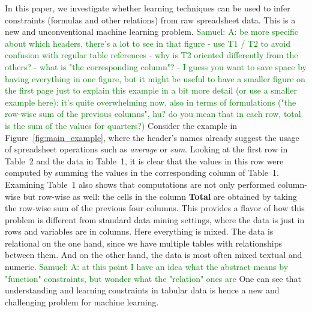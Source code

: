 \documentclass{IEEEtran}
\newcommand{\samuel}[1]{\textcolor{green}{{\sc Samuel:} #1}\xspace}
\theoremstyle{definition}
\begin{document}
In this paper,  we investigate whether learning techniques can be used to infer constraints (formulas and other relations) from raw spreadsheet data.
This is a new and unconventional machine learning problem.
\samuel{A: be more specific about which headers, there's a lot to see in that figure - 
use T1 / T2 to avoid confusion with regular table references
 - 
why is T2 oriented differently from the others?
 - 
what is "the corresponding column"?
 - 
I guess you want to save space by having everything in one figure, but it might be useful to have a smaller figure on the first page just to explain this example in a bit more detail (or use a smaller example here); it's quite overwhelming now, also in terms of formulations ("the row-wise sum of the previous columns", hu? do you mean that in each row, total is the sum of the values for quarters?)}
Consider the example in Figure~\ref{fig:main_example}, where the header's names already suggest the usage of spreadsheet operations such as \textit{average} or \textit{sum}.
Looking at the first row in Table~2 and the data in Table~1, it is clear that the values in this row were computed by summing the values in the corresponding column of Table~1.
Examining Table~1 also shows that computations are not only performed column-wise but row-wise as well: the cells in the column \textbf{Total} are obtained by taking the row-wise sum of the previous four columns.
This provides a flavor of how this problem is different from standard data mining settings, where the data is just in rows and variables are in columns. Here everything is mixed. The data is relational on the one hand, since we have multiple tables with relationships between them. And on the other hand, the data is most often mixed textual and numeric. %
\samuel{A: at this point I have an idea what the abstract means by "function" constraints, but wonder what the "relation" ones are}
One can see that understanding and learning constraints in tabular data is hence a new and challenging problem for machine learning.
\end{document}
